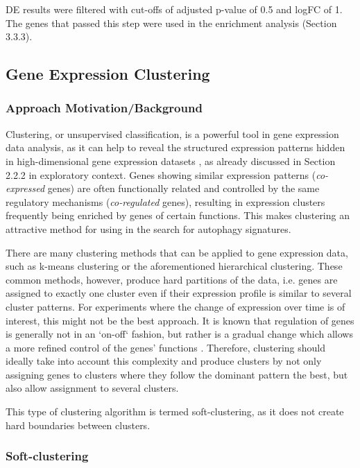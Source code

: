         DE results were filtered with cut-offs of adjusted p-value of 0.5 and logFC of 1. The genes that passed this step were used in the enrichment analysis (Section 3.3.3). 


    \newpage
    \subsection{Gene Expression Clustering}
    
 
\subsubsection{Approach Motivation/Background}
Clustering, or unsupervised classification,  is a powerful tool in gene expression data analysis, as it can help to reveal the structured expression patterns hidden in high-dimensional gene expression datasets \cite{Kumar2007Mfuzz:Data}, as already discussed in Section 2.2.2 in exploratory context. Genes showing similar expression patterns (\textit{co-expressed} genes) are often functionally related and controlled by the same regulatory mechanisms (\textit{co-regulated} genes), resulting in expression clusters frequently being enriched by genes of certain functions. This makes clustering an attractive method for using in the search for autophagy signatures. 
 
There are many clustering methods that can be applied to gene expression data, such as k-means clustering or the aforementioned hierarchical clustering. These common methods, however, produce hard partitions of the data, i.e. genes are assigned to exactly one cluster even if their expression profile is similar to several cluster patterns. For experiments where the change of expression over time is of interest, this might not be the best approach. It is known that regulation of genes is generally not in an `on-off` fashion, but rather is a gradual change which allows a more refined control of the genes' functions  \cite{Kumar2007Mfuzz:Data}. Therefore, clustering should ideally take into account this complexity and produce clusters by not only assigning genes to clusters where they follow the dominant pattern the best, but also allow assignment to several clusters.
 
This type of clustering algorithm is termed soft-clustering, as it does not  create hard boundaries between clusters. 
 
\subsubsection{Soft-clustering}
 
